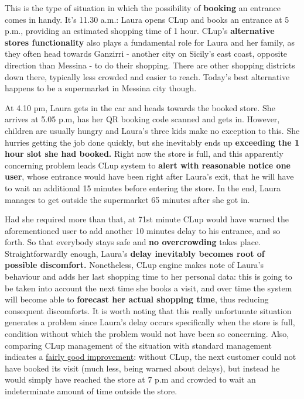 This is the type of situation in which the possibility of \textbf{booking} an entrance comes in handy. It's 11.30 a.m.: Laura opens CLup and books an entrance at 5 p.m., providing an estimated shopping time of 1 hour. \newline
CLup's \textbf{alternative stores functionality} also plays a fundamental role for Laura and her family, as they often head towards Ganzirri - another city on Sicily's east coast, opposite direction than Messina - to do their shopping. There are other shopping districts down there, typically less crowded and easier to reach. Today's best alternative happens to be a supermarket in Messina city though.

At 4.10 pm, Laura gets in the car and heads towards the booked store. She arrives at 5.05 p.m, has her QR booking code scanned and gets in. \newline
However, children are usually hungry and Laura's three kids make no exception to this. She hurries getting the job done quickly, but she inevitably ends up \textbf{exceeding the 1 hour slot she had booked.} \newline
Right now the store is full, and this apparently concerning problem leads CLup system to \textbf{alert with reasonable notice one user}, whose entrance would have been right after Laura's exit, that he will have to wait an additional 15 minutes before entering the store. \newline
In the end, Laura manages to get outside the supermarket 65 minutes after she got in. 


Had she required more than that, at 71st minute CLup would have warned the aforementioned user to add another 10 minutes delay to his entrance, and so forth. So that everybody stays safe and \textbf{no overcrowding} takes place.\newline
Straightforwardly enough, Laura's \textbf{delay inevitably becomes root of possible discomfort.} Nonetheless, CLup engine makes note of Laura's behaviour and adds her last shopping time to her personal data: this is going to be taken into account the next time she books a visit, and over time the system will become able to \textbf{forecast her actual shopping time}, thus reducing consequent discomforts.\newline
It is worth noting that this really unfortunate situation generates a problem since Laura's delay occurs specifically when the store is full, condition without which the problem would not have been so concerning.\newline
Also, comparing CLup management of the situation with standard management indicates a \underline{fairly good improvement}: without CLup, the next customer could not have booked its visit (much less, being warned about delays), but instead he would simply have reached the store at 7 p.m and crowded to wait an indeterminate amount of time outside the store.

